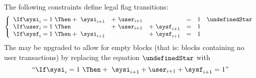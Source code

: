 The following constraints define legal flag transitions:
\[
	\left\{ \begin{array}{lrrrrr}
		\If \sysi _{i} = 1 ~ \Then + ~ \sysi _{i + 1} & + ~ \user _{i + 1} &                    & = & 1 & \undefinedStar \\
		\If \user _{i} = 1 ~ \Then   ~                & + ~ \user _{i + 1} & + ~ \sysf _{i + 1} & = & 1 \\
		\If \sysf _{i} = 1 ~ \Then + ~ \sysi _{i + 1} & ~                  & + ~ \sysf _{i + 1} & = & 1 \\
	\end{array} \right.
\]
\saNote{}
The \zkEvm{} may be upgraded to allow for empty blocks (that is: blocks containing no user transactions)
by replacing the equation $\undefinedStar$ with
\[
	``\If \sysi _{i} = 1 ~ \Then + ~ \sysi _{i + 1} + \user _{i + 1} + \sysf _{i + 1} = 1"
\]


